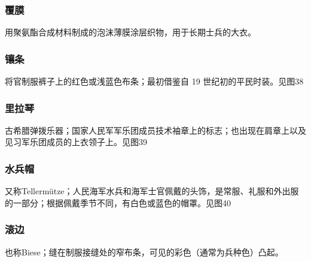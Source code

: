 \subsubsection*{覆膜}%

用聚氨酯合成材料制成的泡沫薄膜涂层织物，用于长期士兵的大衣。

\subsubsection*{镶条}%

将官制服裤子上的红色或浅蓝色布条；最初借鉴自 19 世纪初的平民时装。见图38

\subsubsection*{里拉琴}%

古希腊弹拨乐器；国家人民军军乐团成员技术袖章上的标志；也出现在肩章上以及见习军乐团成员的上衣领子上。见图39

\subsubsection*{水兵帽}%

又称Tellermütze；人民海军水兵和海军士官佩戴的头饰，是常服、礼服和外出服的一部分；根据佩戴季节不同，有白色或蓝色的帽罩。见图40

\subsubsection*{滚边}%

也称Biese；缝在制服接缝处的窄布条，可见的彩色（通常为兵种色）凸起。

